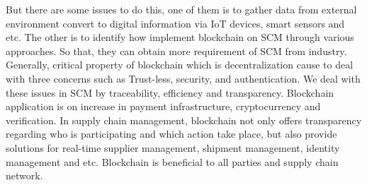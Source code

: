  But there are some issues to do this, one of them is to gather data from external environment convert to digital information via IoT devices, smart sensors and etc. The other is to identify how implement blockchain on SCM through various approaches. So that, they can obtain more requirement of SCM from industry.\\
Generally, critical property of blockchain which is decentralization cause to deal with three concerns such as Trust-less, security, and authentication. We deal with these issues in SCM by traceability, efficiency and transparency.
Blockchain application is on increase in payment infrastructure, cryptocurrency and verification. In supply chain management, blockchain not only offers transparency regarding who is participating and which action take place, but also provide solutions for real-time supplier management, shipment management, identity management and etc. Blockchain is beneficial to all parties and supply chain network. \\

